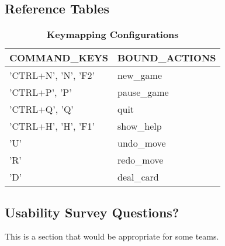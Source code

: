 \documentclass[12pt, titlepage]{article}
\begin{document}
	\subsection{Reference Tables}
	\begin{table}[hbp]
		\caption{\textbf{Keymapping Configurations}} \label{keymap}
		\begin{tabularx}{\textwidth}{p{6cm}X}
			\toprule
			\textbf{COMMAND\_KEYS} & \textbf{BOUND\_ACTIONS} \\
			\midrule
			'CTRL+N', 'N', 'F2' & new\_game\\
			'CTRL+P', 'P' & pause\_game\\
			'CTRL+Q', 'Q' & quit\\
			'CTRL+H', 'H', 'F1' & show\_help\\
			'U' & undo\_move\\
			'R' & redo\_move\\
			'D' & deal\_card\\
			\bottomrule
		\end{tabularx}
	\end{table}

	\subsection{Usability Survey Questions?}
	This is a section that would be appropriate for some teams.
\end{document}
